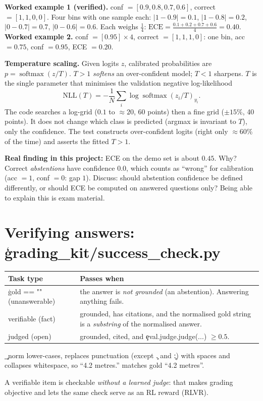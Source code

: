 \begin{keyidea}\textbf{Worked example 1 (verified).} conf $=[0.9,0.8,0.7,0.6]$, correct $=[1,1,0,0]$. Four bins with one sample each: $|1-0.9|=0.1$, $|1-0.8|=0.2$, $|0-0.7|=0.7$, $|0-0.6|=0.6$. Each weighs $\frac14$: $\mathrm{ECE}=\frac{0.1+0.2+0.7+0.6}{4}=0.40$.\\
\textbf{Worked example 2.} conf $=[0.95]\times4$, correct $=[1,1,1,0]$: one bin, acc $=0.75$, conf $=0.95$, ECE $=0.20$.\end{keyidea}

\textbf{Temperature scaling.} Given logits $z$, calibrated probabilities are $p=\operatorname{softmax}(z/T)$. $T>1$ \emph{softens} an over-confident model; $T<1$ sharpens. $T$ is the single parameter that minimises the validation negative log-likelihood
\[ \mathrm{NLL}(T)=-\frac1N\sum_i\log\operatorname{softmax}(z_i/T)_{y_i}. \]
The code searches a log-grid ($0.1$ to $\approx20$, 60 points) then a fine grid ($\pm15\%$, 40 points). It does not change which class is predicted (argmax is invariant to $T$), only the confidence. The test constructs over-confident logits (right only $\approx60\%$ of the time) and asserts the fitted $T>1$.

\begin{gotcha}
\textbf{Real finding in this project:} ECE on the demo set is about $0.45$. Why? Correct \emph{abstentions} have confidence $0.0$, which counts as ``wrong'' for calibration (acc $=1$, conf $=0$: gap $1$). Discuss: should abstention confidence be defined differently, or should ECE be computed on answered questions only? Being able to explain this is exam material.
\end{gotcha}

\section{Verifying answers: \c{grading\_kit/success\_check.py}}
\begin{center}\begin{tabular}{@{}p{4.5cm}p{10cm}@{}}\toprule Task type & Passes when \\ \midrule
\c{gold == ""} (unanswerable) & the answer is \emph{not grounded} (an abstention). Answering anything fails. \\
verifiable (fact) & grounded, has citations, and the normalised gold string is a \emph{substring} of the normalised answer. \\
judged (open) & grounded, cited, and \c{eval.judge.judge(...)} $\ge0.5$. \\
\bottomrule\end{tabular}\end{center}
\c{\_norm} lower-cases, replaces punctuation (except \c{.} and \c{:}) with spaces and collapses whitespace, so ``4.2 metres.'' matches gold ``4.2 metres''. \begin{why}A verifiable item is checkable \emph{without a learned judge}: that makes grading objective and lets the same check serve as an RL reward (RLVR).\end{why}

